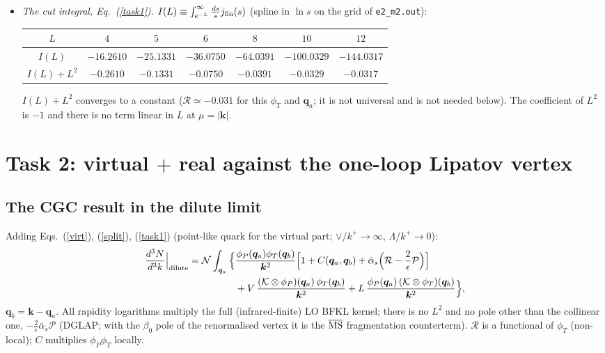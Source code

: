 \documentclass[11pt,a4paper]{article}
\renewcommand{\v}[1]{\bm{#1}}
\newcommand{\ab}{\bar\alpha_s}
\newcommand{\MSbar}{\overline{\rm MS}}
\begin{document}
\begin{itemize}
\begin{center}
\begin{tabular}{|c|cccccccc|}
\end{tabular}
\end{center}
A linear fit $j_{\rm fin}=a\ln s+b$ gives $a=2.0004$, $b=0.006$ on $-12\le\ln s\le-10$ ($a=2.0014$, $b=0.016$ on $[-12,-8]$; the deviation is the $O(s\ln^2s)$ correction): the coefficient of the pole is $c\to1$ and $j_{\rm fin}\to\ln s^2$, as claimed. (For $\ln s<-13$ the double-precision evaluation of $A_{gg}$ loses accuracy; not used.)
\item \emph{The cut integral, Eq.~(\ref{task1}).} $I(L)\equiv\int_{e^{-L}}^\infty\frac{ds}{s}j_{\rm fin}(s)$ (spline in $\ln s$ on the grid of \texttt{e2\_m2.out}):
\begin{center}
\begin{tabular}{|c|cccccc|}\hline
$L$ & $4$ & $5$ & $6$ & $8$ & $10$ & $12$\\\hline
$I(L)$ & $-16.2610$ & $-25.1331$ & $-36.0750$ & $-64.0391$ & $-100.0329$ & $-144.0317$\\
$I(L)+L^2$ & $-0.2610$ & $-0.1331$ & $-0.0750$ & $-0.0391$ & $-0.0329$ & $-0.0317$\\\hline
\end{tabular}
\end{center}
$I(L)+L^2$ converges to a constant ($\mathcal R\simeq-0.031$ for this $\phi_T$ and $\v q_a$; it is not universal and is not needed below). The coefficient of $L^2$ is $-1$ and there is no term linear in $L$ at $\mu=|\v k|$.
\end{itemize}

\section{Task 2: virtual $+$ real against the one-loop Lipatov vertex}
\subsection{The CGC result in the dilute limit}
Adding Eqs.~(\ref{virt}), (\ref{split}), (\ref{task1}) (point-like quark for the virtual part; $\vee/k^+\to\infty$, $\Lambda/k^+\to0$):
\begin{align}
\frac{d^3N}{d^3k}\Big|_{\rm dilute}=\mathcal N\int_{\v q_a}\Big\{&\frac{\phi_P(\v q_a)\phi_T(\v q_b)}{\v k^2}\Big[1+C(\v q_a,\v q_b)+\ab\Big(\mathcal R-\frac2\epsilon\mathcal P\Big)\Big]\notag\\
&+V\,\frac{(\mathcal K\otimes\phi_P)(\v q_a)\,\phi_T(\v q_b)}{\v k^2}+L\,\frac{\phi_P(\v q_a)\,(\mathcal K\otimes\phi_T)(\v q_b)}{\v k^2}\Big\},\label{cgc}
\end{align}
$\v q_b=\v k-\v q_a$. All rapidity logarithms multiply the full (infrared-finite) LO BFKL kernel; there is no $L^2$ and no pole other than the collinear one, $-\frac2\epsilon\ab\mathcal P$ (DGLAP; with the $\beta_0$ pole of the renormalised vertex it is the $\MSbar$ fragmentation counterterm). $\mathcal R$ is a functional of $\phi_T$ (non-local); $C$ multiplies $\phi_P\phi_T$ locally.
\end{document}
